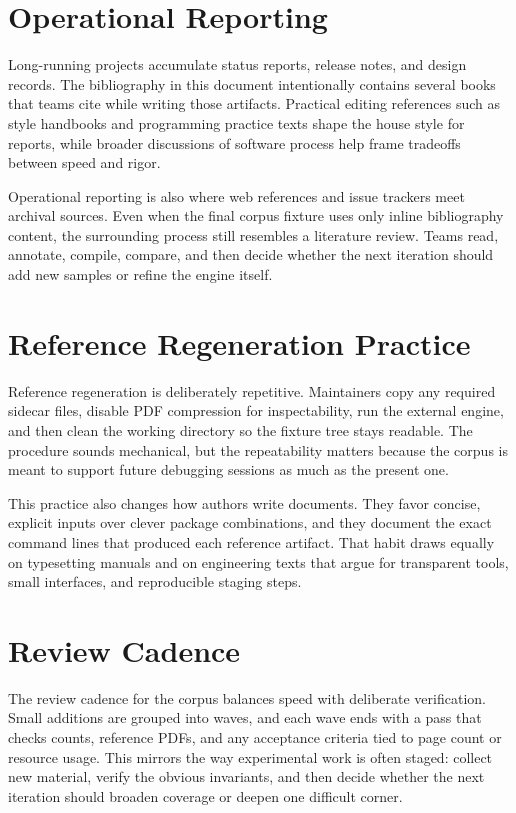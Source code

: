\documentclass{article}
\begin{document}
\section{Operational Reporting}
Long-running projects accumulate status reports, release notes, and design
records. The bibliography in this document intentionally contains several books
that teams cite while writing those artifacts. Practical editing references such
as style handbooks and programming practice texts shape the house style for
reports, while broader discussions of software process help frame tradeoffs
between speed and rigor.

Operational reporting is also where web references and issue trackers meet
archival sources. Even when the final corpus fixture uses only inline
bibliography content, the surrounding process still resembles a literature
review. Teams read, annotate, compile, compare, and then decide whether the next
iteration should add new samples or refine the engine itself.

\clearpage
\section{Reference Regeneration Practice}
Reference regeneration is deliberately repetitive. Maintainers copy any required
sidecar files, disable PDF compression for inspectability, run the external
engine, and then clean the working directory so the fixture tree stays readable.
The procedure sounds mechanical, but the repeatability matters because the
corpus is meant to support future debugging sessions as much as the present one.

This practice also changes how authors write documents. They favor concise,
explicit inputs over clever package combinations, and they document the exact
command lines that produced each reference artifact. That habit draws equally on
typesetting manuals and on engineering texts that argue for transparent tools,
small interfaces, and reproducible staging steps.

\section{Review Cadence}
The review cadence for the corpus balances speed with deliberate verification.
Small additions are grouped into waves, and each wave ends with a pass that
checks counts, reference PDFs, and any acceptance criteria tied to page count or
resource usage. This mirrors the way experimental work is often staged: collect
new material, verify the obvious invariants, and then decide whether the next
iteration should broaden coverage or deepen one difficult corner.
\end{document}
